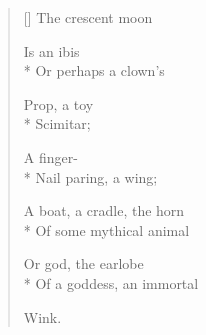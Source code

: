 \label{ch:over_venezia}
\begin{verse}[\versewidth]
The crescent moon

Is an ibis\\*
Or perhaps a clown's

Prop, a toy\\*
Scimitar;

A finger-\\*
Nail paring, a wing;

A boat, a cradle, the horn\\*
Of some mythical animal

Or god, the earlobe\\*
Of a goddess, an immortal

\hspace*{3\vgap} Wink.
\end{verse}
